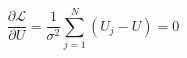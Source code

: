 \documentclass[A4,11pt]{article}
\begin{document}
\thispagestyle{empty}
$$
\frac{\partial\mathcal{L}}{\partial U}    =  \frac{1}{\sigma^2}\sum\limits_{j=1}^N (U_j-U) = 0 
$$
\end{document}
